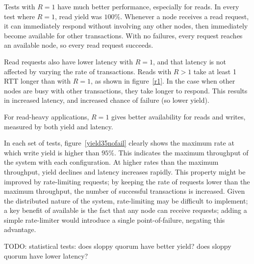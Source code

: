\documentclass[12pt,a4paper,twoside,openany]{report}
\begin{document}
Tests with $R = 1$ have much better performance, especially for reads. In every test where $R = 1$, read yield was $100\%$. Whenever a node receives a read request, it can immediately respond without involving any other nodes, then immediately become available for other transactions. With no failures, every request reaches an available node, so every read request succeeds.

Read requests also have lower latency with $R = 1$, and that latency is not affected by varying the rate of transactions. %
Reads with $R > 1$ take at least 1 RTT longer than with $R = 1$, as shown in figure~\ref{r1}. In the case when other nodes are busy with other transactions, they take longer to respond. This results in increased latency, and increased chance of failure (so lower yield).

For read-heavy applications, $R = 1$ gives better availability for reads and writes, measured by both yield and latency.

In each set of tests, figure~\ref{yield35nofail} clearly shows the maximum rate at which write yield is higher than $95\%$. This indicates the maximum throughput of the system with each configuration. At higher rates than the maximum throughput, yield declines and latency increases rapidly. %
This property might be improved by rate-limiting requests; by keeping the rate of requests lower than the maximum throughput, the number of successful transactions is increased. Given the distributed nature of the system, rate-limiting may be difficult to implement; a key benefit of available is the fact that any node can receive requests; adding a simple rate-limiter would introduce a single point-of-failure, negating this advantage.

TODO: statistical tests: does sloppy quorum have better yield? does sloppy quorum have lower latency?
\end{document}
